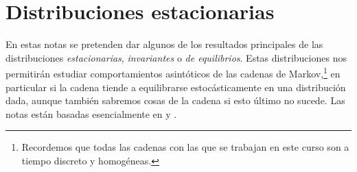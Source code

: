 \chapter{Distribuciones estacionarias}

\noindent En estas notas se pretenden dar algunos de los resultados principales de las distribuciones \emph{estacionarias}, \emph{invariantes} o \emph{de equilibrios}. Estas distribuciones nos permitirán estudiar comportamientos asintóticos de las cadenas de Markov,\footnote{Recordemos que todas las cadenas con las que se trabajan en este curso son a tiempo discreto y homogéneas.} en particular si la cadena tiende a equilibrarse estocásticamente en una distribución dada, aunque también sabremos cosas de la cadena si esto último no sucede. Las notas están basadas esencialmente en \cite{Hoel72} y \cite{Norris97}.

